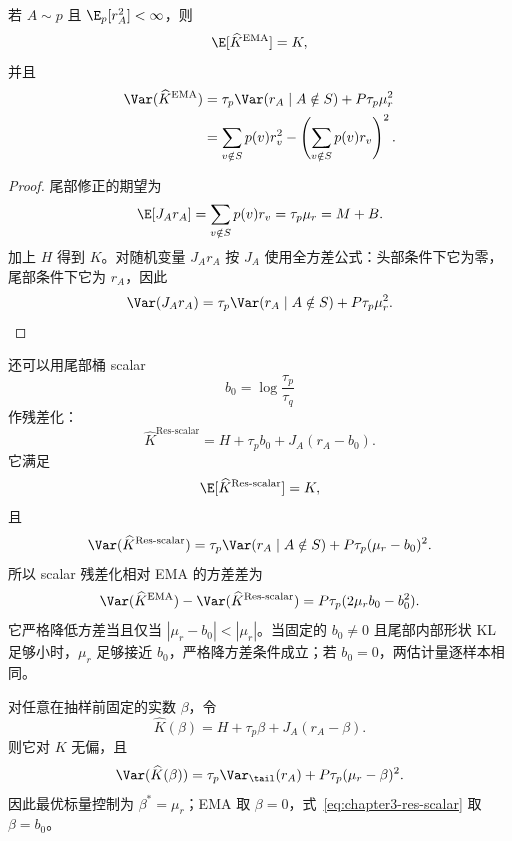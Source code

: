 \begin{theorem}
\label{thm:chapter3-ema-scalar}
若 $A\sim p$ 且 $\E_p[r_A^2]<\infty$，则
\[
 \E[\widehat K^{\mathrm{EMA}}]=K,
\]
并且
\begin{align}
 \Var(\widehat K^{\mathrm{EMA}})
 &=\tau_p\Var(r_A\mid A\notin S)+P\tau_p\mu_r^2\\
 &=\sum_{v\notin S}p(v)r_v^2
   -\left(\sum_{v\notin S}p(v)r_v\right)^2.
 \label{eq:chapter3-ema-scalar-var}
\end{align}
\end{theorem}

\begin{proof}
尾部修正的期望为
\[
 \E[J_A r_A]=\sum_{v\notin S}p(v)r_v=\tau_p\mu_r=M+B.
\]
加上 $H$ 得到 $K$。对随机变量 $J_A r_A$ 按 $J_A$ 使用全方差公式：头部条件下它为零，尾部条件下它为 $r_A$，因此
\[
 \Var(J_A r_A)=\tau_p\Var(r_A\mid A\notin S)+P\tau_p\mu_r^2.
\]
\end{proof}

还可以用尾部桶 scalar
\[
 b_0=\log\frac{\tau_p}{\tau_q}
\]
作残差化：
\begin{equation}
 \widehat K^{\mathrm{Res\text{-}scalar}}
 =H+\tau_pb_0+J_A(r_A-b_0).
 \label{eq:chapter3-res-scalar}
\end{equation}
它满足
\[
 \E[\widehat K^{\mathrm{Res\text{-}scalar}}]=K,
\]
且
\begin{equation}
 \Var(\widehat K^{\mathrm{Res\text{-}scalar}})
 =\tau_p\Var(r_A\mid A\notin S)+P\tau_p(\mu_r-b_0)^2.
 \label{eq:chapter3-res-scalar-var}
\end{equation}
所以 scalar 残差化相对 EMA 的方差差为
\begin{equation}
 \Var(\widehat K^{\mathrm{EMA}})-\Var(\widehat K^{\mathrm{Res\text{-}scalar}})
 =P\tau_p(2\mu_rb_0-b_0^2).
 \label{eq:chapter3-res-scalar-gap}
\end{equation}
它严格降低方差当且仅当 $|\mu_r-b_0|<|\mu_r|$。当固定的 $b_0\ne0$ 且尾部内部形状 KL 足够小时，$\mu_r$ 足够接近 $b_0$，严格降方差条件成立；若 $b_0=0$，两估计量逐样本相同。

\begin{proposition}[标量尾部控制族]
对任意在抽样前固定的实数 $\beta$，令
\[
 \widehat K(\beta)=H+\tau_p\beta+J_A(r_A-\beta).
\]
则它对 $K$ 无偏，且
\[
 \Var(\widehat K(\beta))
 =\tau_p\Var_{\tail}(r_A)+P\tau_p(\mu_r-\beta)^2.
\]
因此最优标量控制为 $\beta^*=\mu_r$；EMA 取 $\beta=0$，式~\eqref{eq:chapter3-res-scalar} 取 $\beta=b_0$。
\end{proposition}

